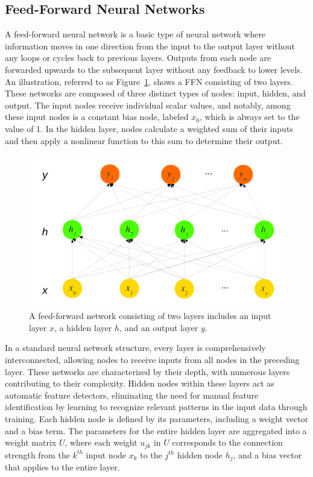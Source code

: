 \subsection{Feed-Forward Neural Networks}
A feed-forward neural network is a basic type of neural network where information moves in one direction from the input to the output layer without any loops or cycles back to previous layers. 
Outputs from each node are forwarded upwards to the subsequent layer without any feedback to lower levels. 
An illustration, referred to as Figure~\ref{fig:ffn}, shows a FFN consisting of two layers. 
These networks are composed of three distinct types of nodes: input, hidden, and output. 
The input nodes receive individual scalar values, and notably, among these input nodes is a constant bias node, labeled $x_0$, which is always set to the value of 1. 
In the hidden layer, nodes calculate a weighted sum of their inputs and then apply a nonlinear function to this sum to determine their output.
\begin{figure}[h]
	\centerline{\includegraphics[width=0.7\linewidth]{Figures/FFN}}
	\caption{A feed-forward network consisting of two layers includes an input layer $x$, a hidden layer $h$, and an output layer $y$.}
	\label{fig:ffn}
\end{figure}
In a standard neural network structure, every layer is comprehensively interconnected, allowing nodes to receive inputs from all nodes in the preceding layer. 
These networks are characterized by their depth, with numerous layers contributing to their complexity. 
Hidden nodes within these layers act as automatic feature detectors, eliminating the need for manual feature identification by learning to recognize relevant patterns in the input data through training. 
Each hidden node is defined by its parameters, including a weight vector and a bias term. 
The parameters for the entire hidden layer are aggregated into a weight matrix $U$, where each weight $u_{jk}$ in $U$ corresponds to the connection strength from the $k^{th}$ input node $x_k$ to the $j^{th}$ hidden node $h_j$, and a bias vector that applies to the entire layer.

